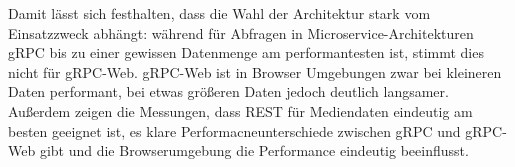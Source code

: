 Damit lässt sich festhalten, dass die Wahl der Architektur stark vom Einsatzzweck abhängt: während für Abfragen in Microservice-Architekturen gRPC bis zu einer gewissen Datenmenge am performantesten ist, stimmt dies nicht für gRPC-Web. gRPC-Web ist in Browser Umgebungen zwar bei kleineren Daten performant, bei etwas größeren Daten jedoch deutlich langsamer. Außerdem zeigen die Messungen, dass REST für Mediendaten eindeutig am besten geeignet ist, es klare Performacneunterschiede zwischen gRPC und gRPC-Web gibt und die Browserumgebung die Performance eindeutig beeinflusst.

\chapterend